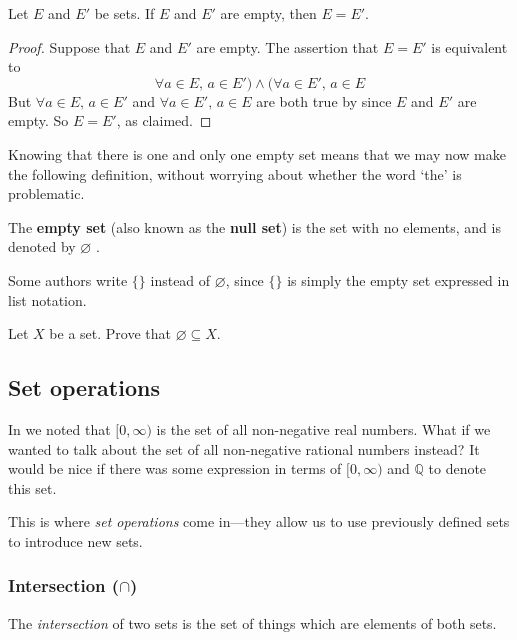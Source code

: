 \begin{theorem}
\label{thmEmptySetIsUnique}
Let $E$ and $E'$ be sets. If $E$ and $E'$ are empty, then $E=E'$.
\end{theorem}
\begin{proof}
Suppose that $E$ and $E'$ are empty. The assertion that $E=E'$ is equivalent to
\[ \forall a \in E,\, a \in E') \wedge (\forall a \in E',\, a \in E \]
But $\forall a \in E,\, a \in E'$ and $\forall a \in E',\, a \in E$ are both true by  since $E$ and $E'$ are empty. So $E=E'$, as claimed.
\end{proof}

Knowing that there is one and only one empty set means that we may now make the following definition, without worrying about whether the word `the' is problematic.

\begin{definition}
\label{defEmptySet}
The \textbf{empty set} (also known as the \textbf{null set}) is the set with no elements, and is denoted by $\varnothing$ .
\end{definition}

Some authors write $\{ \}$ instead of $\varnothing$, since $\{ \}$ is simply the empty set expressed in list notation.

\begin{exercise}
\label{exEmptySetSubsetOfEverySet}
Let $X$ be a set. Prove that $\varnothing \subseteq X$.
\end{exercise}

\subsection*{Set operations}

In  we noted that $[0,\infty)$ is the set of all non-negative real numbers. What if we wanted to talk about the set of all non-negative rational numbers instead? It would be nice if there was some expression in terms of $[0,\infty)$ and $\mathbb{Q}$ to denote this set.

This is where \textit{set operations} come in---they allow us to use previously defined sets to introduce new sets.

\subsubsection*{Intersection ($\cap$)}
The \textit{intersection} of two sets is the set of things which are elements of both sets.


